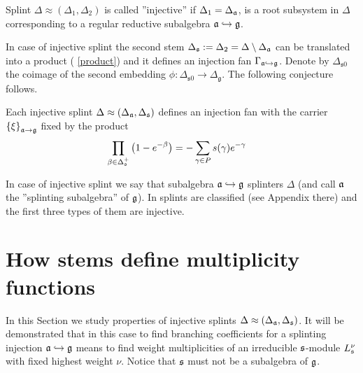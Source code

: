 Splint $\Delta \approx (\Delta _{1},\Delta _{2})$ is called ''injective'' if
$\Delta _{1}=\Delta _{\frak{a}}$, is a root subsystem
in $\Delta $ corresponding to a regular reductive subalgebra $\frak{a}%
\hookrightarrow \frak{g}$.

In case of injective splint the second stem $\Delta _{\frak{s}}:=\Delta
_{2}=\Delta \setminus \Delta _{\frak{a}}$ can be translated into a product (%
\ref{product}) and it defines an injection fan $\Gamma _{\frak{a}%
\hookrightarrow \frak{g}}$. Denote by $\Delta_{\mathfrak{s}0}$ the coimage of the second embedding $\phi:\Delta_{\mathfrak{s}0}\to \Delta_{\mathfrak{g}}$.
The following conjecture follows.

\begin{Cnj}
Each injective splint $\Delta \approx (\Delta _{\frak{a}},\Delta _{\frak{s}})
$ defines an injection fan with the carrier $\left\{ \xi \right\} _{\frak{a}%
\rightarrow \frak{g}}$ fixed by the product
\begin{equation}
\prod_{\beta \in \Delta _{\frak{s}}^{+}}\left( 1-e^{-\beta }\right)
=-\sum_{\gamma \in P}s(\gamma )e^{-\gamma }\quad   \label{splint product}
\end{equation}
\end{Cnj}

In case of injective splint we say that subalgebra $\frak{a}\hookrightarrow \frak{g}$
splinters $\Delta $ (and call $\frak{a}$ the ''splinting subalgebra'' of $%
\frak{g}$). In \cite{richter2008splints} splints are classified (see Appendix there)
and the first three types of them are injective.

\section{How stems define multiplicity functions}

\label{sec:stems and multiplicity functions}

In this Section we study properties of injective splints  $\Delta \approx (\Delta _{\frak{a}},\Delta _{\frak{s}})
$. It will
be demonstrated that in this case to find branching
coefficients for a splinting injection $\frak{a}\hookrightarrow
\frak{g}$ means to find weight multiplicities of an irreducible
$\frak{s}$-module $L_{\frak{s}}^{\nu }$ with fixed highest weight
$\nu $. Notice that $\frak{s}$ must not be a subalgebra of
$\frak{g}$.

